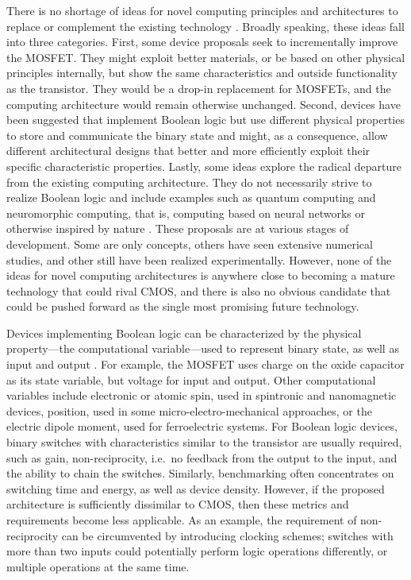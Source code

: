 There is no shortage of ideas for novel computing principles and architectures
to replace or complement the existing technology \cite{cavin2012science}
\cite{bernstein2010device}. Broadly speaking, these ideas fall into three
categories. First, some device proposals seek to incrementally improve the
MOSFET. They might exploit better materials, or be based on other physical
principles internally, but show the same characteristics and outside
functionality as the transistor. They would be a drop-in replacement for
MOSFETs, and the computing architecture would remain otherwise unchanged.
Second, devices have been suggested that implement Boolean logic but use
different physical properties to store and communicate the binary state and
might, as a consequence, allow different architectural designs that better and
more efficiently exploit their specific characteristic properties. Lastly, some
ideas explore the radical departure from the existing computing architecture.
They do not necessarily strive to realize Boolean logic and include examples
such as quantum computing and neuromorphic computing, that is, computing based
on neural networks or otherwise inspired by nature \cite{mead1990neuromorphic}
\cite{schemmel2010wafer} \cite{furber2012overview}. These proposals are at
various stages of development. Some are only concepts, others have seen
extensive numerical studies, and other still have been realized experimentally.
However, none of the ideas for novel computing architectures is anywhere close
to becoming a mature technology that could rival CMOS, and there is also no
obvious candidate that could be pushed forward as the single most promising
future technology.

Devices implementing Boolean logic can be characterized by the physical
property---the computational variable---used to represent binary state, as well
as input and output \cite{nikonov2013overview}. For example, the MOSFET uses
charge on the oxide capacitor as its state variable, but voltage for input and
output. Other computational variables include electronic or atomic spin, used in
spintronic and nanomagnetic devices, position, used in some
micro-electro-mechanical approaches, or the electric dipole moment, used for
ferroelectric systems. For Boolean logic devices, binary switches with
characteristics similar to the transistor are usually required, such as gain,
non-reciprocity, i.e.~no feedback from the output to the input, and the ability
to chain the switches. Similarly, benchmarking often concentrates on switching
time and energy, as well as device density. However, if the proposed
architecture is sufficiently dissimilar to CMOS, then these metrics and
requirements become less applicable. As an example, the requirement of
non-reciprocity can be circumvented by introducing clocking schemes; switches
with more than two inputs could potentially perform logic operations
differently, or multiple operations at the same time.

